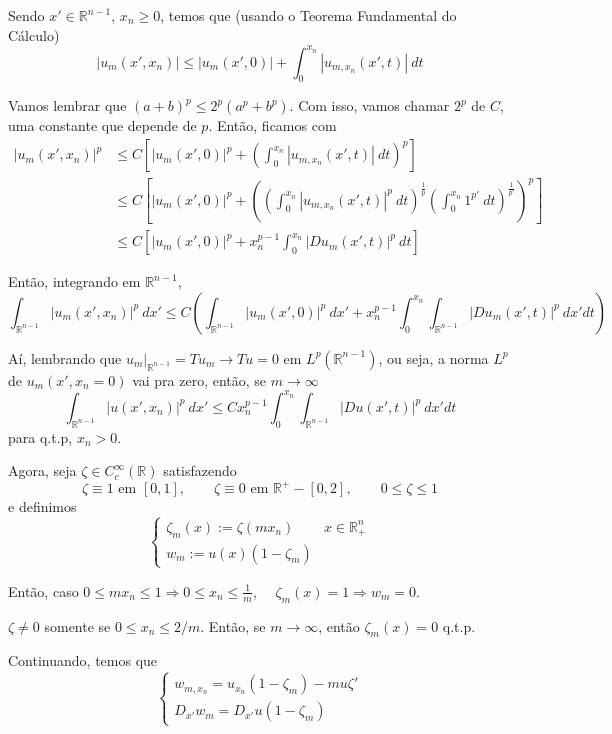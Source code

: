 \documentclass[a4paper, 11pt]{book}
\newcommand{\R}{\mathbb{R}}
\begin{document}
Sendo $ x' \in \R^{n-1} $, $ x_n\geq0 $, temos que (usando o Teorema Fundamental do Cálculo) \[ \left| u_m(x', x_n) \right| \leq | u_m(x',0) | + \int_0^{x_n} |u_{m,x_n}(x',t)| \ dt   \] 

Vamos lembrar que \( (a+b)^p \leq 2^p (a^p + b^p) \). Com isso, vamos chamar \( 2^p \) de $C$, uma constante que depende de $p$. Então, ficamos com \begin{align*}
	\left| u_m(x', x_n) \right|^p &\leq C \left[ | u_m(x',0) |^p + \left( \int_0^{x_n} |u_{m,x_n}(x',t)| \ dt \right)^p \right] \\
	&\leq C \left[ | u_m(x',0) |^p + \left( \left(\int_0^{x_n} |u_{m,x_n}(x',t)|^p \ dt\right)^{\frac{1}{p}} \left(\int_0^{x_n}1^{p'}\ dt\right)^{\frac{1}{p'}}  \right)^p \right] \\
	&\leq C\left[ | u_m(x',0) |^p + x_n^{p-1} \int_0^{x_n} |Du_{m}(x',t)|^{p}\ dt \right]
\end{align*}



Então, integrando em $\R^{n-1}$, \[ \int_{\R^{n-1}} | u_m(x',x_n) |^p\ dx' \leq C \left(  \int_{\R^{n-1}} | u_m(x',0) |^p \ dx' + x_n^{p-1} \int_0^{x_n} \int_{\R^{n-1}} | Du_m(x',t)|^p\ dx' dt  \right)\]

Aí, lembrando que $ u_m |_{\R^{n-1}} = Tu_m \rightarrow Tu=0 \text{ em } L^p(\R^{n-1})$, ou seja, a norma $L^p$ de $u_m(x',x_n=0)$ vai pra zero, então, se $m \rightarrow \infty$ \[  \int_{\R^{n-1}} | u(x',x_n) |^p\ dx' \leq C  x_n^{p-1} \int_0^{x_n} \int_{\R^{n-1}} | Du(x',t)|^p\ dx' dt  \] para q.t.p, $x_n>0$.


Agora, seja $\zeta \in C^\infty_c(\R)$ satisfazendo \[ \zeta \equiv 1 \text{ em } [0,1], \qquad \zeta \equiv 0 \text{ em } \R^+ - [0,2], \qquad 0 \leq \zeta \leq 1 \] e definimos \[ \begin{cases}
	\zeta_m(x) := \zeta (mx_n) & x \in \R^n_+ \\
	w_m := u(x)(1 - \zeta_m)
\end{cases} \]

Então, caso $ 0 \leq mx_n \leq 1 \Rightarrow 0 \leq x_n \leq \frac{1}{m} $, $\quad \zeta_m(x)=1 \Rightarrow w_m=0$.

$ \zeta \neq 0  $ somente se $ 0 \leq x_n \leq 2/m $. Então, se $ m \rightarrow \infty $, então $\zeta_m(x) = 0 $ q.t.p.

Continuando, temos que \[ \begin{cases}
	w_{m,x_n}=u_{x_n}(1 - \zeta_m) - mu\zeta' \\
	D_{x'}w_m = D_{x'}u(1-\zeta_m)
\end{cases} \]
\end{document}

